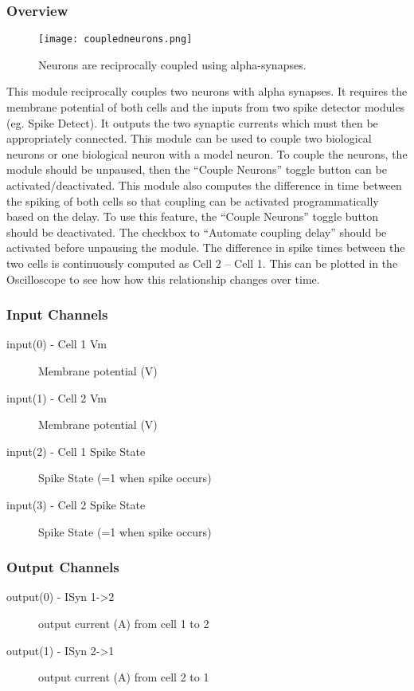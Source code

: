 \subsubsection{Overview}
\label{Coupled Neurons}
\begin{figure}[h]
\begin{center}
\texttt{[image: coupledneurons.png]} 
\caption[Reciprocally Coupled Neurons]{Neurons are reciprocally coupled using alpha-synapses.} 
\end{center}
\label{coupledneurons}
\end{figure}

This module reciprocally couples two neurons with alpha synapses. It requires the membrane potential of both cells and the inputs from two spike detector modules (eg. Spike Detect). It outputs the two synaptic currents which must then be appropriately connected. This module can be used to couple two biological neurons or one biological neuron with a model neuron. To couple the neurons, the module should be unpaused, then the ``Couple Neurons” toggle button can be activated/deactivated. This module also computes the difference in time between the spiking of both cells so that coupling can be activated programmatically based on the delay. To use this feature, the ``Couple Neurons” toggle button should be deactivated. The checkbox to ``Automate coupling delay” should be activated before unpausing the module. The difference in spike times between the two cells is continuously computed as Cell 2 – Cell 1. This can be plotted in the Oscilloscope to see how how this relationship changes over time.

\subsubsection{Input Channels}
\begin{description}
\item[input(0) - Cell 1 Vm] Membrane potential (V)
\item[input(1) - Cell 2 Vm] Membrane potential (V)
\item[input(2) - Cell 1 Spike State] Spike State (=1 when spike occurs)
\item[input(3) - Cell 2 Spike State] Spike State (=1 when spike occurs)
\end{description}

\subsubsection{Output Channels}
\begin{description}
\item[output(0) - ISyn 1->2] output current (A) from cell 1 to 2
\item[output(1) - ISyn 2->1] output current (A) from cell 2 to 1
\end{description}

